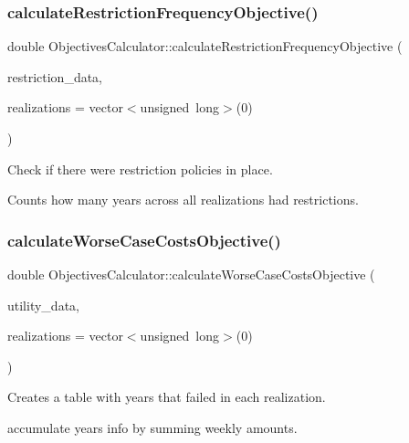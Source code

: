 \subsubsection{\texorpdfstring{calculate\+Restriction\+Frequency\+Objective()}{calculateRestrictionFrequencyObjective()}}
{\footnotesize\ttfamily double Objectives\+Calculator\+::calculate\+Restriction\+Frequency\+Objective (\begin{DoxyParamCaption}\item[{const vector$<$ \mbox{\hyperlink{classRestrictionsDataCollector}{Restrictions\+Data\+Collector}} $\ast$$>$ \&}]{restriction\+\_\+data,  }\item[{vector$<$ unsigned long $>$}]{realizations = {\ttfamily vector$<$unsigned~long$>$(0)} }\end{DoxyParamCaption})\hspace{0.3cm}{\ttfamily [static]}}

Check if there were restriction policies in place.

Counts how many years across all realizations had restrictions. \mbox{\label{classObjectivesCalculator_a74cf53d4a7abbb2ea34304844262a826}} 
\subsubsection{\texorpdfstring{calculate\+Worse\+Case\+Costs\+Objective()}{calculateWorseCaseCostsObjective()}}
{\footnotesize\ttfamily double Objectives\+Calculator\+::calculate\+Worse\+Case\+Costs\+Objective (\begin{DoxyParamCaption}\item[{const vector$<$ \mbox{\hyperlink{classUtilitiesDataCollector}{Utilities\+Data\+Collector}} $\ast$$>$ \&}]{utility\+\_\+data,  }\item[{vector$<$ unsigned long $>$}]{realizations = {\ttfamily vector$<$unsigned~long$>$(0)} }\end{DoxyParamCaption})\hspace{0.3cm}{\ttfamily [static]}}

Creates a table with years that failed in each realization.

accumulate year\textquotesingle{}s info by summing weekly amounts.

